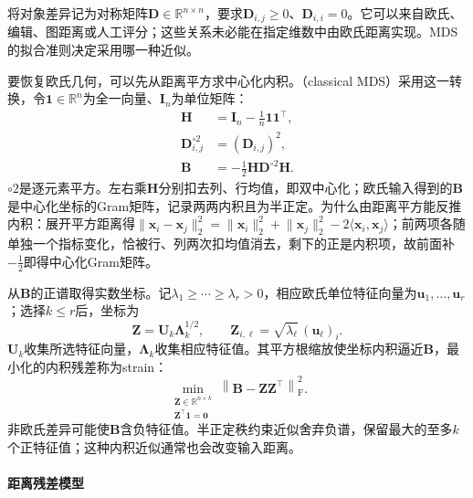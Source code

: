 将对象差异记为对称矩阵$\bm{D}\in\mathbb{R}^{n\times n}$，要求$\bm{D}_{i,j}\geq0$、$\bm{D}_{i,i}=0$。它可以来自欧氏、编辑、图距离或人工评分；这些关系未必能在指定维数中由欧氏距离实现。MDS的拟合准则决定采用哪一种近似。

要恢复欧氏几何，可以先从距离平方求中心化内积。（classical MDS）采用这一转换，令$\bm{1}\in\mathbb{R}^n$为全一向量、$\bm{I}_n$为单位矩阵：
\begin{equation}
  \label{eq:dim-mds-centering}
  \begin{aligned}
    \bm{H}&=\bm{I}_n-\frac{1}{n}\bm{1}\bm{1}^{\top},\\
    \bm{D}^{\circ2}_{i,j}&=(\bm{D}_{i,j})^2,\\
    \bm{B}&=-\frac12\bm{H}\bm{D}^{\circ2}\bm{H}.
  \end{aligned}
\end{equation}
$\circ2$是逐元素平方。左右乘$\bm{H}$分别扣去列、行均值，即双中心化；欧氏输入得到的$\bm{B}$是中心化坐标的Gram矩阵，记录两两内积且为半正定。为什么由距离平方能反推内积：展开平方距离得$\lVert\bm{x}_i-\bm{x}_j\rVert_2^2=\lVert\bm{x}_i\rVert_2^2+\lVert\bm{x}_j\rVert_2^2-2\langle\bm{x}_i,\bm{x}_j\rangle$；前两项各随单独一个指标变化，恰被行、列两次扣均值消去，剩下的正是内积项，故前面补$-\tfrac12$即得中心化Gram矩阵。

从$\bm{B}$的正谱取得实数坐标。记$\lambda_1\geq\cdots\geq\lambda_r>0$，相应欧氏单位特征向量为$\bm{u}_1,\ldots,\bm{u}_r$；选择$k\leq r$后，坐标为
\begin{equation}
  \label{eq:dim-mds-coordinates}
  \bm{Z}=\bm{U}_k\bm{\Lambda}_k^{1/2},
  \qquad
  \bm{Z}_{i,\ell}=\sqrt{\lambda_\ell}\,(\bm{u}_\ell)_i.
\end{equation}
$\bm{U}_k$收集所选特征向量，$\bm{\Lambda}_k$收集相应特征值。其平方根缩放使坐标内积逼近$\bm{B}$，最小化的内积残差称为strain：
\begin{equation}
  \label{eq:dim-mds-strain}
  \min_{\substack{\bm{Z}\in\mathbb{R}^{n\times k}\\
                  \bm{Z}^{\top}\bm{1}=\bm{0}}}
  \left\lVert\bm{B}-\bm{Z}\bm{Z}^{\top}\right\rVert_{\mathrm{F}}^2.
\end{equation}
非欧氏差异可能使$\bm{B}$含负特征值。半正定秩约束近似舍弃负谱，保留最大的至多$k$个正特征值；这种内积近似通常也会改变输入距离。

\paragraph{距离残差模型}

